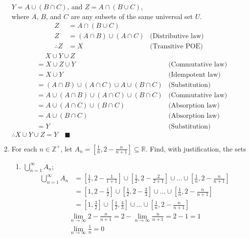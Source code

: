 \documentclass[letterpaper, 12pt]{article}
\newcommand{\qed}{\quad \blacksquare}
\newcommand{\Z}{\mathbb{Z}}
\newcommand{\R}{\mathbb{R}}
\newcommand{\0}{\emptyset}
\begin{document}
\begin{enumerate}
$Y = A \cup (B \cap C)$, and $Z = A \cap (B \cup C)$, \\ where $A$, $B$, and $C$ are any subsets 
of the same universal set $U$.
\begin{align*}
    Z &= A \cap (B \cup C) \\
    Z &= (A \cap B) \cup (A \cap C) &\text{(Distributive law)} \\
    \therefore Z &= X &\text{(Transitive POE)}
\end{align*}
\begin{align*}
    &\quad\; X \cup Y \cup Z \\
    &= X \cup Z \cup Y &\text{(Commutative law)}\\
    &= X \cup Y &\text{(Idempotent law)}\\
    &= (A \cap B) \cup (A \cap C) \cup A \cup (B \cap C) &\text{(Substitution)}\\
    &= A \cup (A \cap B) \cup (A \cap C) \cup (B \cap C) &\text{(Commutative law)}\\
    &= A \cup (A \cap C) \cup (B \cap C) &\text{(Absorption law)}\\
    &= A \cup (B \cap C) &\text{(Absorption law)}\\
    &= Y &\text{(Substitution)}
\end{align*}
$\therefore X \cup Y \cup Z = Y \qed$
\pagebreak
\item For each $n \in \Z^+$, let $A_n = [\frac{1}{n}, 2 - \frac{n}{n+1}] \subseteq \R$. Find, 
with justification, the sets 
\begin{enumerate}
\item $\displaystyle\bigcup_{n=1}^{\infty} A_n$;
\begin{align*}
    \bigcup_{n=1}^{\infty} A_n &= \left[\frac{1}{1}, 2 - \frac{1}{1+1}\right] 
    \cup \left[\frac{1}{2}, 2 - \frac{2}{2+1}\right] 
    \cup \dots 
    \cup \left[\frac{1}{n}, 2 - \frac{n}{n+1}\right] \\
    &= \left[1, 2 - \frac{1}{2}\right] 
    \cup \left[\frac{1}{2}, 2 - \frac{2}{3}\right] 
    \cup \dots 
    \cup \left[\frac{1}{n}, 2 - \frac{n}{n+1}\right] \\
    &= \left[1, \frac{3}{2}\right] 
    \cup \left[\frac{1}{2}, \frac{4}{3}\right] 
    \cup \dots 
    \cup \left[\frac{1}{n}, 2 - \frac{n}{n+1}\right]
\end{align*}
\begin{align*}
    \lim_{n \to \infty} 2 - \frac{n}{n+1} = 2 - \lim_{n \to \infty} \frac{n}{n+1} = 2 - 1 = 1 \\
    \lim_{n \to \infty} \frac{1}{n} = 0 \\

\end{align*}
\end{enumerate}
\end{enumerate}
\end{document}
